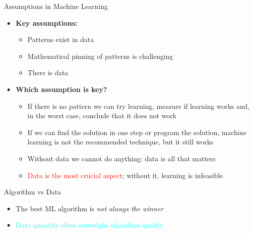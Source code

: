 \documentclass[aspectratio=169, xcolor=dvipsnames]{beamer}
\begin{document}
  \begin{frame}{Assumptions in Machine Learning}
    \begin{itemize}
      \item \textbf{Key assumptions:}
        \begin{itemize}
          \item Patterns exist in data

          \item Mathematical pinning of patterns is challenging

          \item There is data
        \end{itemize}

      \item \textbf{Which assumption is key?}
        \begin{itemize}
          \item If there is no pattern we can try learning, measure if learning
            works and, in the worst case, conclude that it does not work

          \item If we can find the solution in one step or program the solution,
            machine learning is not the recommended technique, but it still works

          \item Without data we cannot do anything: data is all that matters

          \item \textcolor{red}{Data is the most crucial aspect}; without it,
            learning is infeasible
        \end{itemize}
    \end{itemize}
  \end{frame}

  \begin{frame}{Algorithm vs Data}
    \begin{itemize}
      \item The best ML algorithm is \textit{not always the winner}

      \item \textcolor{cyan}{Data quantity often outweighs algorithm quality}
    \end{itemize}
  \end{frame}
\end{document}
